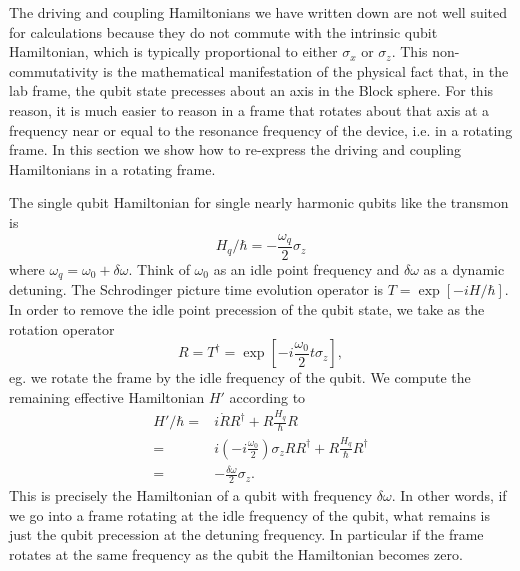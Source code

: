 
The driving and coupling Hamiltonians we have written down are not well suited for calculations because they do not commute with the intrinsic qubit Hamiltonian, which is typically proportional to either $\sigma_x$ or $\sigma_z$.
This non-commutativity is the mathematical manifestation of the physical fact that, in the lab frame, the qubit state precesses about an axis in the Block sphere.
For this reason, it is much easier to reason in a frame that rotates about that axis at a frequency near or equal to the resonance frequency of the device, i.e. in a rotating frame.
In this section we show how to re-express the driving and coupling Hamiltonians in a rotating frame.

The single qubit Hamiltonian for single nearly harmonic qubits like the transmon is \begin{equation}
H_q/\hbar = -\frac{\omega_q}{2}\sigma_z \end{equation}
where $\omega_q = \omega_0 + \delta\omega$. Think of $\omega_0$ as an idle point frequency and $\delta \omega$ as a dynamic detuning.
The Schrodinger picture time evolution operator is $T=\exp \left[-i H/\hbar \right]$.
In order to remove the idle point precession of the qubit state, we take as the rotation operator \begin{equation}
R = T^{\dagger} = \exp \left[ -i \frac{\omega_0}{2} t \sigma_z \right], \end{equation}
eg. we rotate the frame by the idle frequency of the qubit.
We compute the remaining effective Hamiltonian $H'$ according to 
\begin{align}
  H'/\hbar
  =& i\dot{R}R^{\dagger} + R \frac{H_q}{\hbar} R \nonumber \\
  =& i \left(-i \frac{\omega_0}{2} \right)\sigma_z RR^{\dagger} + R\frac{H_q}{\hbar}R^{\dagger} \nonumber \\
  =& -\frac{\delta\omega}{2}\sigma_z.
\end{align}
This is precisely the Hamiltonian of a qubit with frequency $\delta\omega$.
In other words, if we go into a frame rotating at the idle frequency of the qubit, what remains is just the qubit precession at the detuning frequency.
In particular if the frame rotates at the same frequency as the qubit the Hamiltonian becomes zero.


